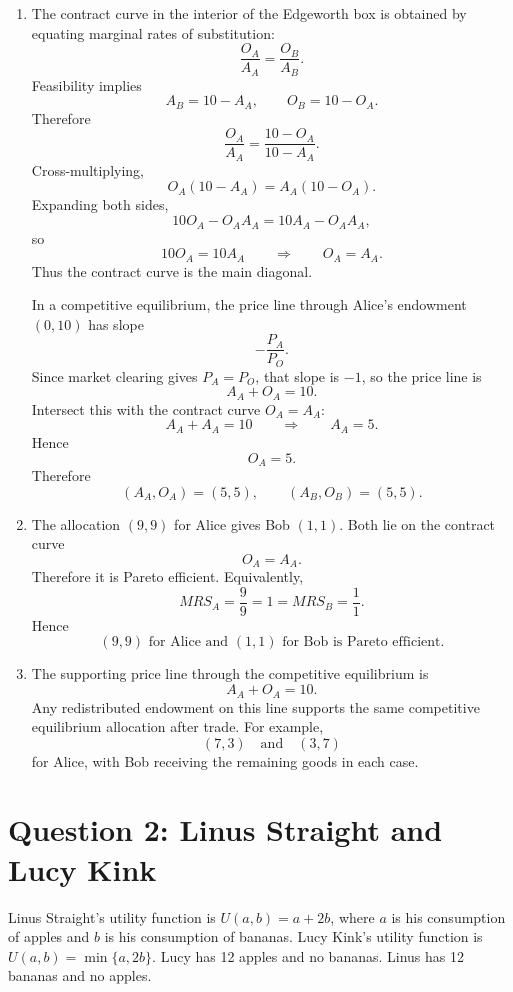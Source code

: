 \documentclass[12pt]{article}
\begin{document}
\begin{enumerate}[label=(\alph*)]
    \item
    The contract curve in the interior of the Edgeworth box is obtained by equating marginal rates of substitution:
    \[
    \frac{O_A}{A_A}=\frac{O_B}{A_B}.
    \]
    Feasibility implies
    \[
    A_B=10-A_A,\qquad O_B=10-O_A.
    \]
    Therefore
    \[
    \frac{O_A}{A_A}=\frac{10-O_A}{10-A_A}.
    \]
    Cross-multiplying,
    \[
    O_A(10-A_A)=A_A(10-O_A).
    \]
    Expanding both sides,
    \[
    10O_A-O_AA_A=10A_A-O_AA_A,
    \]
    so
    \[
    10O_A=10A_A
    \qquad\Longrightarrow\qquad
    \boxed{O_A=A_A.}
    \]
    Thus the contract curve is the main diagonal.

    In a competitive equilibrium, the price line through Alice's endowment \((0,10)\) has slope
    \[
    -\frac{P_A}{P_O}.
    \]
    Since market clearing gives \(P_A=P_O\), that slope is \(-1\), so the price line is
    \[
    A_A+O_A=10.
    \]
    Intersect this with the contract curve \(O_A=A_A\):
    \[
    A_A+A_A=10
    \qquad\Longrightarrow\qquad
    A_A=5.
    \]
    Hence
    \[
    O_A=5.
    \]
    Therefore
    \[
    \boxed{(A_A,O_A)=(5,5),\qquad (A_B,O_B)=(5,5).}
    \]

    \item
    The allocation \((9,9)\) for Alice gives Bob \((1,1)\). Both lie on the contract curve
    \[
    O_A=A_A.
    \]
    Therefore it is Pareto efficient. Equivalently,
    \[
    MRS_A=\frac{9}{9}=1=MRS_B=\frac{1}{1}.
    \]
    Hence
    \[
    \boxed{(9,9)\text{ for Alice and }(1,1)\text{ for Bob is Pareto efficient.}}
    \]

    \item
    The supporting price line through the competitive equilibrium is
    \[
    A_A+O_A=10.
    \]
    Any redistributed endowment on this line supports the same competitive equilibrium allocation after trade. For example,
    \[
    \boxed{(7,3)\quad\text{and}\quad (3,7)}
    \]
    for Alice, with Bob receiving the remaining goods in each case.
\end{enumerate}

\newpage
\section{Question 2: Linus Straight and Lucy Kink}

\noindent
Linus Straight's utility function is \(U(a,b)=a+2b\), where \(a\) is his consumption of apples and \(b\) is his consumption of bananas. Lucy Kink's utility function is \(U(a,b)=\min\{a,2b\}\). Lucy has 12 apples and no bananas. Linus has 12 bananas and no apples.
\end{document}

